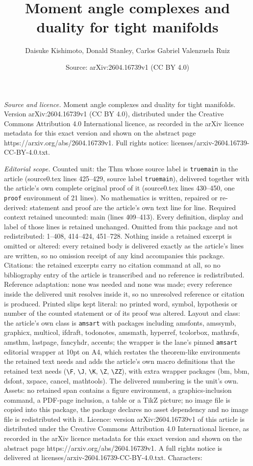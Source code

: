 \documentclass[10pt,a4paper]{amsart}
\title[Moment angle complexes and duality for tight manifolds]{Moment angle complexes and duality for tight manifolds}
\author{Daisuke Kishimoto, Donald Stanley, Carlos Gabriel Valenzuela Ruiz}
\date{Source: arXiv:2604.16739v1 (CC BY 4.0)}
\begin{document}
\maketitle

\noindent\emph{Source and licence.} Moment angle complexes and duality for tight manifolds. Version arXiv:2604.16739v1 (CC BY 4.0), distributed under the Creative Commons Attribution 4.0 International licence, as recorded in the arXiv licence metadata for this exact version and shown on the abstract page https://arxiv.org/abs/2604.16739v1. Full rights notice: licenses/arxiv-2604.16739-CC-BY-4.0.txt.\par\smallskip

\noindent\textit{Editorial scope.} Counted unit: the Thm whose source label is \texttt{truemain} in the article (source0.tex lines 425--429, source label \texttt{truemain}), delivered together with the article's own complete original proof of it (source0.tex lines 430--450, one \texttt{proof} environment of 21 lines). No mathematics is written, repaired or re-derived: statement and proof are the article's own text line for line. Required context retained uncounted: main (lines 409--413). Every definition, display and label of those lines is retained unchanged. Omitted from this package and not redistributed: 1--408, 414--424, 451--728. Nothing inside a retained excerpt is omitted or altered: every retained body is delivered exactly as the article's lines are written, so no omission receipt of any kind accompanies this package. Citations: the retained excerpts carry no citation command at all, so no bibliography entry of the article is transcribed and no reference is redistributed. Reference adaptation: none was needed and none was made; every reference inside the delivered unit resolves inside it, so no unresolved reference or citation is produced. Printed slips kept literal: no printed word, symbol, hypothesis or number of the counted statement or of its proof was altered. Layout and class: the article's own class is \texttt{amsart} with packages including amsfonts, amssymb, graphicx, multicol, ifdraft, todonotes, amsmath, hyperref, tcolorbox, mathrsfs, amsthm, lastpage, fancyhdr, accents; the wrapper is the lane's pinned \texttt{amsart} editorial wrapper at 10pt on A4, which restates the theorem-like environments the retained text needs and adds the article's own macro definitions that the retained text needs (\texttt{\textbackslash F}, \texttt{\textbackslash J}, \texttt{\textbackslash K}, \texttt{\textbackslash Z}, \texttt{\textbackslash ZZ}), with extra wrapper packages (bm, bbm, dsfont, xspace, cancel, mathtools). The delivered numbering is the unit's own. Assets: no retained span contains a figure environment, a graphics-inclusion command, a PDF-page inclusion, a table or a TikZ picture; no image file is copied into this package, the package declares no asset dependency and no image file is redistributed with it. Licence: version arXiv:2604.16739v1 of this article is distributed under the Creative Commons Attribution 4.0 International licence, as recorded in the arXiv licence metadata for this exact version and shown on the abstract page https://arxiv.org/abs/2604.16739v1. A full rights notice is delivered at licenses/arxiv-2604.16739-CC-BY-4.0.txt. Characters: 
\end{document}
